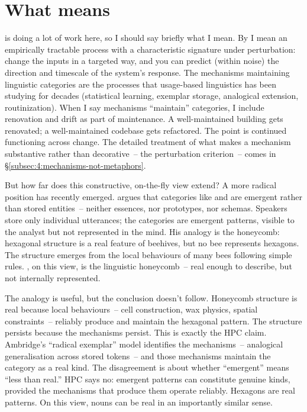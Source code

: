 \section{What  means}
\label{sec:4:mechanisms}

 is doing a lot of work here, so I should say briefly what I mean. By  I mean an empirically tractable process with a characteristic signature under perturbation: change the inputs in a targeted way, and you can predict (within noise) the direction and timescale of the system's response. The mechanisms maintaining linguistic categories are the processes that usage-based linguistics has been studying for decades (statistical learning, exemplar storage, analogical extension, routinization). When I say mechanisms \enquote{maintain} categories, I include renovation and drift as part of maintenance. A well-maintained building gets renovated; a well-maintained codebase gets refactored. The point is continued functioning across change. The detailed treatment of what makes a mechanism substantive rather than decorative~-- the perturbation criterion~-- comes in §\ref{subsec:4:mechanisms-not-metaphors}.

But how far does this constructive, on-the-fly view extend? A more radical position has recently emerged. \textcite{ambridge2020radical} argues that categories like  and  are emergent rather than stored entities~-- neither essences, nor prototypes, nor schemas. Speakers store only individual utterances; the categories are emergent patterns, visible to the analyst but not represented in the mind. His analogy is the honeycomb: hexagonal structure is a real feature of beehives, but no bee represents hexagons. The structure emerges from the local behaviours of many bees following simple rules. , on this view, is the linguistic honeycomb~-- real enough to describe, but not internally represented.

The analogy is useful, but the conclusion doesn't follow. Honeycomb structure is real because local behaviours~-- cell construction, wax physics, spatial constraints~-- reliably produce and maintain the hexagonal pattern. The structure persists because the mechanisms persist. This is exactly the HPC claim. Ambridge's \enquote{radical exemplar} model identifies the mechanisms~-- analogical generalisation across stored tokens~-- and those mechanisms maintain the category as a real kind. The disagreement is about whether \enquote{emergent} means \enquote{less than real.} HPC says no: emergent patterns can constitute genuine kinds, provided the mechanisms that produce them operate reliably. Hexagons are real patterns. On this view, nouns can be real in an importantly similar sense.


